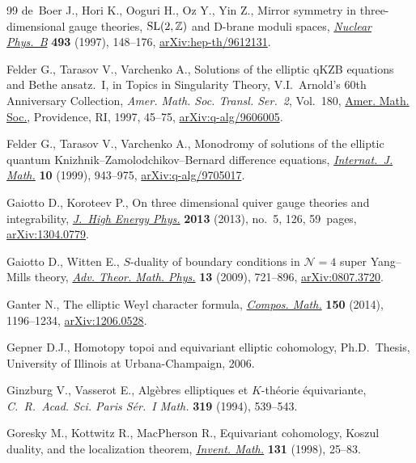 \begin{thebibliography}{99}
de~Boer J., Hori K., Ooguri H., Oz Y., Yin Z., Mirror symmetry in
 three-dimensional gauge theories, {${\rm SL}(2,{\mathbb Z})$} and {D}-brane
 moduli spaces, \href{https://doi.org/10.1016/S0550-3213(97)00115-6}{\textit{Nuclear Phys.~B}} \textbf{493} (1997), 148--176,
 \href{https://arxiv.org/abs/hep-th/9612131}{arXiv:hep-th/9612131}.

Felder G., Tarasov V., Varchenko A., Solutions of the elliptic q{KZB} equations
 and {B}ethe ansatz.~{I}, in Topics in Singularity Theory, V.I.~Arnold's 60th
 Anniversary Collection, \textit{Amer. Math. Soc. Transl. Ser.~2}, Vol.~180,
 \href{https://doi.org/10.1090/trans2/180/04}{Amer. Math. Soc.}, Providence, RI, 1997, 45--75, \href{https://arxiv.org/abs/q-alg/9606005}{arXiv:q-alg/9606005}.

Felder G., Tarasov V., Varchenko A., Monodromy of solutions of the elliptic
 quantum {K}nizhnik--{Z}amolodchikov--{B}ernard difference equations,
 \href{https://doi.org/10.1142/S0129167X99000410}{\textit{Internat.~J. Math.}} \textbf{10} (1999), 943--975,
 \href{https://arxiv.org/abs/q-alg/9705017}{arXiv:q-alg/9705017}.

Gaiotto D., Koroteev P., On three dimensional quiver gauge theories and
 integrability, \href{https://doi.org/10.1007/JHEP05(2013)126}{\textit{J.~High Energy Phys.}} \textbf{2013} (2013), no.~5,
 126, 59~pages, \href{https://arxiv.org/abs/1304.0779}{arXiv:1304.0779}.

Gaiotto D., Witten E., {$S$}-duality of boundary conditions in {${\mathcal
 N}=4$} super {Y}ang--{M}ills theory, \href{https://doi.org/10.4310/ATMP.2009.v13.n3.a5}{\textit{Adv. Theor. Math. Phys.}}
 \textbf{13} (2009), 721--896, \href{https://arxiv.org/abs/0807.3720}{arXiv:0807.3720}.

Ganter N., The elliptic {W}eyl character formula, \href{https://doi.org/10.1112/S0010437X1300777X}{\textit{Compos. Math.}}
 \textbf{150} (2014), 1196--1234, \href{https://arxiv.org/abs/1206.0528}{arXiv:1206.0528}.

Gepner D.J., Homotopy topoi and equivariant elliptic cohomology, Ph.D.~Thesis,
 {U}niversity of Illinois at Urbana-Champaign, 2006.

Ginzburg V., Vasserot E., Alg\`ebres elliptiques et {$K$}-th\'{e}orie
 \'{e}quivariante, \textit{C.~R.~Acad. Sci. Paris S\'{e}r.~I Math.}
 \textbf{319} (1994), 539--543.

Goresky M., Kottwitz R., MacPherson R., Equivariant cohomology, {K}oszul
 duality, and the localization theorem, \href{https://doi.org/10.1007/s002220050197}{\textit{Invent. Math.}} \textbf{131}
 (1998), 25--83.


\end{thebibliography}
